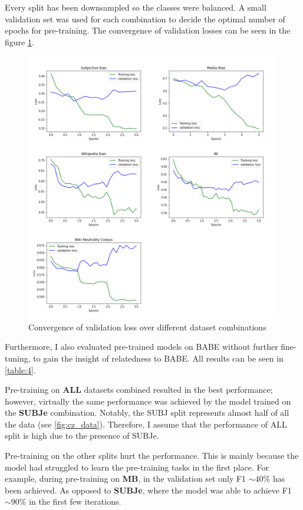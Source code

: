 Every split has been downsampled so the classes were balanced. A small validation set was used for each combination to decide the optimal number of epochs for pre-training. The convergence of validation losses can be seen in the figure \ref{fig:all_losses}.
\begin{figure}
  \includegraphics[scale=0.5]{my_modules/multimedia/all_losses.png}
  \caption{Convergence of validation loss over different dataset combinations}
  \label{fig:all_losses}
\end{figure}

Furthermore, I also evaluated pre-trained models on BABE without further fine-tuning, to gain the insight of relatedness to BABE. All results can be seen in \ref{table:4}.

Pre-training on \textbf{ALL} datasets combined resulted in the best performance; however, virtually the same performance was achieved by the model trained on the \textbf{SUBJe} combination. Notably, the SUBJ split represents almost half of all the data (see \ref{fig:cz_data}). Therefore, I assume that the performance of ALL split is high due to the presence of SUBJe.

Pre-training on the other splits hurt the performance. This is mainly because the model had struggled to learn the pre-training tasks in the first place. For example, during pre-training on \textbf{MB}, in the validation set only F1 $\sim40\%$ has been achieved. As opposed to \textbf{SUBJe}, where the model was able to achieve F1 $\sim90\%$ in the first few iterations.


